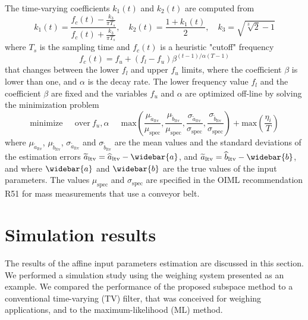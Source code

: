 The time-varying coefficients $k_1(t)$ and $k_2(t)$ are computed from
\begin{equation} k_1(t) = \frac{f_c(t) - \frac{k_3}{\pi T_s}}{f_c(t) + \frac{k_3}{\pi T_s}}, \quad k_2(t) = \frac{1 + k_1(t)}{2} , \quad k_3 = \sqrt{ \sqrt[3]{2}  - 1} \end{equation}
where $T_s$ is the sampling time and $f_c(t)$ is a heuristic "cutoff" frequency
\begin{equation} f_c(t) = f_u + \left( f_l - f_u \right) \beta^{\left( t-1 \right) /  \alpha \left( T-1 \right) } \end{equation}
that changes between the lower $f_l$ and upper $f_u$ limits, where the coefficient $\beta$ is lower than one, and $\alpha$ is the decay rate. 
The lower frequency value $f_l$ and the coefficient $\beta$ are fixed and the variables $f_u$ and $\alpha$ are optimized off-line by solving the minimization problem 
\begin{equation} \mathrm{minimize} \ \quad \ \mathrm{over} \ f_u, \alpha \ \quad \ \mathrm{max} \left( \dfrac{\mu_{\widetilde{a}_{\mathrm{ltv}}}}{\mu_{\mathrm{spec}}}, \dfrac{\mu_{\widetilde{b}_{\mathrm{ltv}}}}{\mu_{\mathrm{spec}}}, \dfrac{\sigma_{\widetilde{a}_{\mathrm{ltv}}}}{\sigma_{\mathrm{spec}}}, \dfrac{\sigma_{\widetilde{b}_{\mathrm{ltv}}}}{\sigma_{\mathrm{spec}}} \right) + \mathrm{max} \left( \dfrac{\eta_{i}}{T} \right) \label{eqn:tv_optim} \end{equation}
where $\mu_{\widetilde{a}_\mathrm{ltv}}$, $\mu_{\widetilde{b}_\mathrm{ltv}}$, $\sigma_{\widetilde{a}_\mathrm{ltv}}$ and $\sigma_{\widetilde{b}_\mathrm{ltv}}$ are the mean values and the standard deviations of the estimation errors $\widetilde{a}_\mathrm{ltv} = \widehat{a}_\mathrm{ltv} - \widebar{a}$, and $\widetilde{a}_\mathrm{ltv} = \widehat{b}_\mathrm{ltv} - \widebar{b}$, and where $\widebar{a}$ and $\widebar{b}$ are the true values of the input parameters.
The values $\mu_{\mathrm{spec}}$ and $\sigma_{\mathrm{spec}}$ are specified in the OIML recommendation R51 \cite{OIML_R51_1} for mass measurements that use a conveyor belt.

\section{Simulation results}
The results of the affine input parameters estimation are discussed in this section.
We performed a simulation study using the weighing system presented as an example.
We compared the performance of the proposed subspace method to a conventional time-varying (TV) filter, that was conceived for weighing applications, and to the maximum-likelihood (ML) method.

